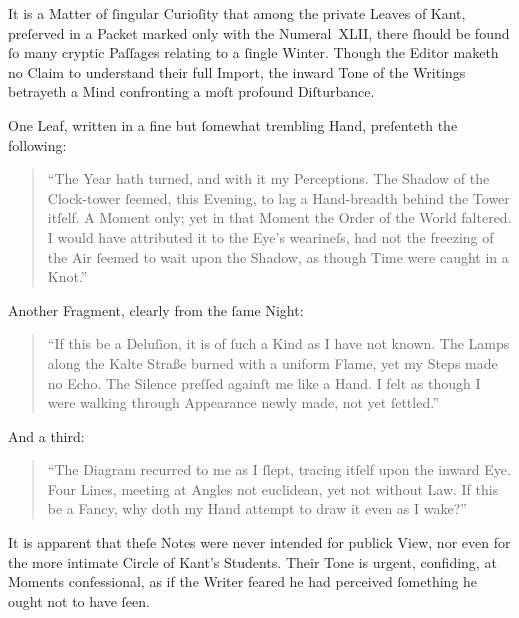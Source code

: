 \documentclass[12pt]{book}
\begin{document}

It is a Matter of ſingular Curioſity that among the private Leaves of Kant, preſerved in a Packet marked only with the Numeral~XLII, there ſhould be found ſo many cryptic Paſſages relating to a ſingle Winter. Though the Editor maketh no Claim to understand their full Import, the inward Tone of the Writings betrayeth a Mind confronting a moſt profound Diſturbance.

One Leaf, written in a fine but ſomewhat trembling Hand, preſenteth the following:

\begin{quote}
``The Year hath turned, and with it my Perceptions.
The Shadow of the Clock-tower ſeemed, this Evening, to lag a Hand-breadth behind the Tower itſelf. A Moment only; yet in that Moment the Order of the World faltered. I would have attributed it to the Eye’s wearineſs, had not the freezing of the Air ſeemed to wait upon the Shadow, as though Time were caught in a Knot.''
\end{quote}

Another Fragment, clearly from the ſame Night:

\begin{quote}
``If this be a Deluſion, it is of ſuch a Kind as I have not known. The Lamps along the Kalte Straße burned with a uniform Flame, yet my Steps made no Echo. The Silence preſſed againſt me like a Hand. I felt as though I were walking through Appearance newly made, not yet ſettled.''
\end{quote}

And a third:

\begin{quote}
``The Diagram recurred to me as I ſlept, tracing itſelf upon the inward Eye. Four Lines, meeting at Angles not euclidean, yet not without Law. If this be a Fancy, why doth my Hand attempt to draw it even as I wake?''
\end{quote}

It is apparent that theſe Notes were never intended for publick View, nor even for the more intimate Circle of Kant’s Students. Their Tone is urgent, confiding, at Moments confessional, as if the Writer feared he had perceived ſomething he ought not to have ſeen.

\end{document}
